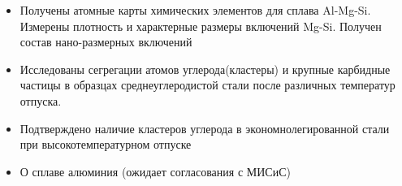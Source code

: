 \begin{enumerate}[beginpenalty=10000]
	\begin{itemize}
		\item Получены атомные карты химических элементов для сплава Al-Mg-Si. Измерены плотность и характерные размеры включений Mg-Si. Получен состав нано-размерных включений
		\item Исследованы сегрегации атомов углерода(кластеры) и крупные карбидные частицы в образцах среднеуглеродистой стали после различных температур отпуска.
		\item Подтверждено наличие кластеров углерода в экономнолегированной стали при высокотемпературном отпуске
		\item О сплаве алюминия (ожидает согласования с МИСиС)
	\end{itemize}
\end{enumerate}


